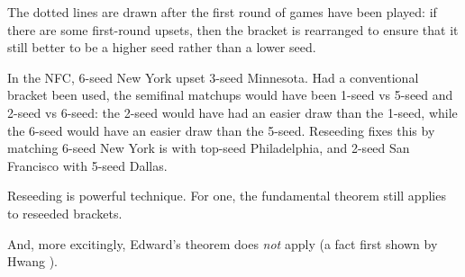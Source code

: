 {

The dotted lines are drawn after the first round of games have been played: if there are some first-round upsets, then the bracket is rearranged to ensure that it still better to be a higher seed rather than a lower seed.


In the NFC, 6-seed New York upset 3-seed Minnesota. Had a conventional bracket been used, the semifinal matchups would have been 1-seed vs 5-seed and 2-seed vs 6-seed: the 2-seed would have had an easier draw than the 1-seed, while the 6-seed would have an easier draw than the 5-seed. Reseeding fixes this by matching 6-seed New York is with top-seed Philadelphia, and 2-seed San Francisco with 5-seed Dallas.

Reseeding is powerful technique. For one, the fundamental theorem still applies to reseeded brackets.


And, more excitingly, Edward's theorem does \textit{not} apply (a fact first shown by Hwang \cite{reseeding}).

    
}
